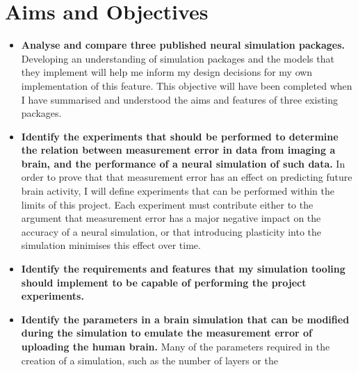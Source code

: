 \section{Aims and Objectives}

\begin{itemize}
    \item \textbf{Analyse and compare three published neural simulation packages.}
          Developing an understanding of simulation packages and the models that
          they implement will help me inform my design decisions for my own
          implementation of this feature. This objective will have been
          completed when I have summarised and understood the aims and features
          of three existing packages.
    \item \textbf{Identify the experiments that should be performed to determine
    the relation between measurement error in data from imaging a brain, and the
    performance of a neural simulation of such data.} In order to prove that
    that measurement error has an effect on predicting future brain activity, I
    will define experiments that can be performed within the limits of this
    project. Each experiment must contribute either to the argument that
    measurement error has a major negative impact on the accuracy of a neural
    simulation, or that introducing plasticity into the simulation minimises
    this effect over time.
    \item \textbf{Identify the requirements and features that my simulation tooling should implement to be capable of performing the project experiments.}
    \item \textbf{Identify the parameters in a brain simulation that can be
              modified during the simulation to emulate the measurement error of
              uploading the human brain.} Many of the parameters required in the
          creation of a simulation, such as the number of layers or the

\end{itemize}
